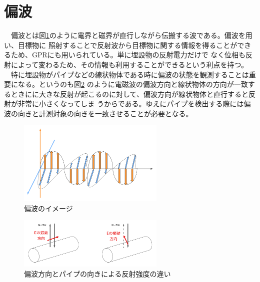 \documentclass[a4paper,12pt]{jsreport}
\begin{document}
\section{偏波}
　偏波とは図\ref{偏波のイメージ}のように電界と磁界が直行しながら伝搬する波である。偏波を用い、目標物に
照射することで反射波から目標物に関する情報を得ることができるため、GPRにも用いられている。単に埋設物の反射電力だけで
なく位相も反射によって変わるため、その情報も利用することができるという利点を持つ。
\\　特に埋設物がパイプなどの線状物体である時に偏波の状態を観測することは重要になる。というのも図\ref{偏波方向とパイプの向きによる反射強度の違い}
のように電磁波の偏波方向と線状物体の方向が一致するときにに大きな反射が起こるのに対して、偏波方向が線状物体と直行すると反射が非常に小さくなってしま
うからである。ゆえにパイプを検出する際には偏波の向きと計測対象の向きを一致させることが必要となる。
\begin{figure}[h]
  \begin{center}
   \includegraphics[width=7cm]{./image/wave_propagation.pdf}
  \caption{偏波のイメージ}\label{偏波のイメージ}
  \end{center}
  \end{figure}

  \begin{figure}[h]
    \begin{center}
     \includegraphics[width=7cm]{./image/polarization.pdf}
    \caption{偏波方向とパイプの向きによる反射強度の違い}\label{偏波方向とパイプの向きによる反射強度の違い}
    \end{center}
    \end{figure}
\end{document}
